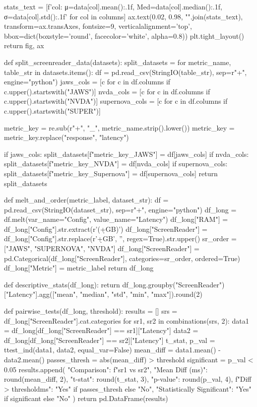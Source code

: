 \begin{pyverbatim}
    stats_text = [f'{col}: μ={data[col].mean():.1f}, Med={data[col].median():.1f}, σ={data[col].std():.1f}' 
                  for col in columns]
    ax.text(0.02, 0.98, "\n".join(stats_text), transform=ax.transAxes, fontsize=9,
            verticalalignment='top', bbox=dict(boxstyle='round', facecolor='white', alpha=0.8))
    plt.tight_layout()
    return fig, ax

def split_screenreader_data(datasets):
    split_datasets = {}
    for metric_name, table_str in datasets.items():
        df = pd.read_csv(StringIO(table_str), sep=r"\s+", engine="python")
        jaws_cols = [c for c in df.columns if c.upper().startswith("JAWS")]
        nvda_cols = [c for c in df.columns if c.upper().startswith("NVDA")]
        supernova_cols = [c for c in df.columns if c.upper().startswith("SUPER")]

        metric_key = re.sub(r"\s+", "_", metric_name.strip().lower())
        metric_key = metric_key.replace("response", "latency")

        if jaws_cols:
            split_datasets[f"{metric_key}_JAWS"] = df[jaws_cols]
        if nvda_cols:
            split_datasets[f"{metric_key}_NVDA"] = df[nvda_cols]
        if supernova_cols:
            split_datasets[f"{metric_key}_Supernova"] = df[supernova_cols]
    return split_datasets

def melt_and_order(metric_label, dataset_str):
    df = pd.read_csv(StringIO(dataset_str), sep=r"\s+", engine="python")
    df_long = df.melt(var_name="Config", value_name="Latency")
    df_long["RAM"] = df_long["Config"].str.extract(r'(\d+GB)')
    df_long["ScreenReader"] = df_long["Config"].str.replace(r'\d+GB', '', regex=True).str.upper()
    sr_order = ["JAWS", "SUPERNOVA", "NVDA"]
    df_long["ScreenReader"] = pd.Categorical(df_long["ScreenReader"], categories=sr_order, ordered=True)
    df_long["Metric"] = metric_label
    return df_long

def descriptive_stats(df_long):
    return df_long.groupby("ScreenReader")["Latency"].agg(["mean", "median", "std", "min", "max"]).round(2)

def pairwise_tests(df_long, threshold):
    results = []
    srs = df_long["ScreenReader"].cat.categories
    for sr1, sr2 in combinations(srs, 2):
        data1 = df_long[df_long["ScreenReader"] == sr1]["Latency"]
        data2 = df_long[df_long["ScreenReader"] == sr2]["Latency"]
        t_stat, p_val = ttest_ind(data1, data2, equal_var=False)
        mean_diff = data1.mean() - data2.mean()
        passes_thresh = abs(mean_diff) > threshold
        significant = p_val < 0.05
        results.append({
            "Comparison": f"{sr1} vs {sr2}",
            "Mean Diff (ms)": round(mean_diff, 2),
            "t-stat": round(t_stat, 3),
            "p-value": round(p_val, 4),
            f"Diff > {threshold}ms": "Yes" if passes_thresh else "No",
            "Statistically Significant": "Yes" if significant else "No"
        })
    return pd.DataFrame(results)


\end{pyverbatim}
